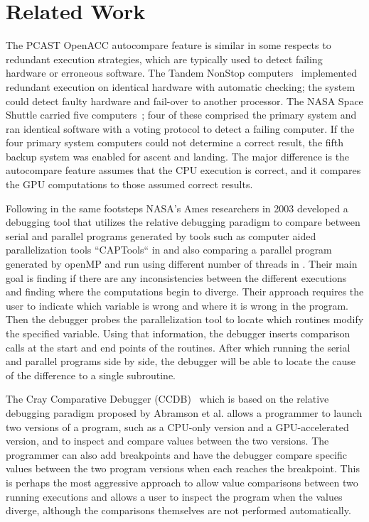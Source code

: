 \section{Related Work}


The PCAST OpenACC autocompare feature is similar in some respects to redundant execution strategies, which are typically used to detect failing hardware or erroneous software.
The Tandem NonStop computers~\cite{bartlett.tandem.86} implemented redundant execution on identical hardware with automatic checking; the system could detect faulty hardware and fail-over to another processor.
The NASA Space Shuttle carried five computers~\cite{fraser.astro.74}; four of these comprised the primary system and ran identical software with a voting protocol to detect a failing computer.
If the four primary system computers could not determine a correct result, the fifth backup system was enabled for ascent and landing.
The major difference is the autocompare feature assumes that the CPU execution is correct, and it compares the GPU computations to those assumed correct results.

Following in the same footsteps NASA’s Ames researchers in 2003 developed a debugging tool that utilizes the relative debugging paradigm to compare between serial and parallel programs generated by tools such as computer aided parallelization tools “CAPTools“ in \cite{jost2003relative} and also comparing a parallel program generated by openMP and run using different number of threads in \cite{matthews2003automatic}. Their main goal is finding if there are any inconsistencies between the different executions and finding where the computations begin to diverge. Their approach requires the user to indicate which variable is wrong and where it is wrong in the program. Then the debugger probes the parallelization tool to locate which routines modify the specified variable. Using that information, the debugger inserts comparison calls at the start and end points of the routines. After which running the serial and parallel programs side by side, the debugger will be able to locate the cause of the difference to a single subroutine. 

The Cray Comparative Debugger (CCDB)~\cite{derose.sc.15} which is based on the relative debugging paradigm proposed by Abramson et al. \cite{abramson1994relative}\cite{abramson1996relative} allows a programmer to launch two versions of a program, such as a CPU-only version and a GPU-accelerated version, and to inspect and compare values between the two versions.
The programmer can also add breakpoints and have the debugger compare specific values between the two program versions when each reaches the breakpoint.
This is perhaps the most aggressive approach to allow value comparisons between two running executions and allows a user to inspect the program when the values diverge, although the comparisons themselves are not performed automatically.

